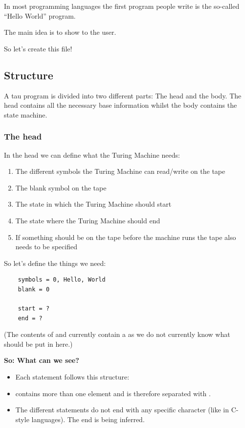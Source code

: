 In most programming languages the first program people write is the so-called ``Hello World'' program.

The main idea is to show  to the user.

\vspace{0.5em}

So let's create this  file!

\subsection{Structure}
A tau program is divided into two different parts: The head and the body. 
The head contains all the necessary base information whilst the body contains the state machine.

\subsubsection{The head}
In the head we can define what the Turing Machine needs:
\begin{enumerate}
    \item The different symbols the Turing Machine can read/write on the tape
    \item The blank symbol on the tape
    \item The state in which the Turing Machine should start
    \item The state where the Turing Machine should end
    \item If something should be on the tape before the machine runs the tape also needs to be specified
\end{enumerate}

So let's define the things we need:
\begin{verbatim}
    symbols = 0, Hello, World
    blank = 0

    start = ?
    end = ?
\end{verbatim}
(The contents of  and  currently contain a  as we do not currently know what should be put in here.)

\vspace{0.8em}

\textbf{So: What can we see?}
\begin{itemize}
    \item Each statement follows this structure: 
    \begin{center}
    \end{center}
    \item {} contains more than one element and is therefore separated with \code{,}.
    \item The different statements do not end with any specific character (like \code{;} in C-style languages).
          The end is being inferred.
\end{itemize}

